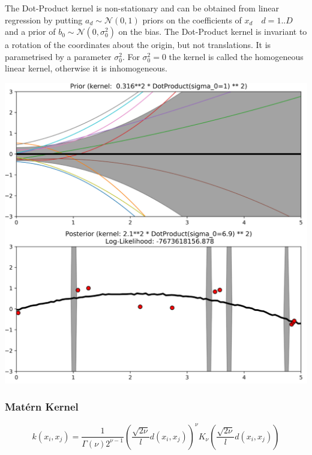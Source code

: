 \documentclass[11pt]{article}
\theoremstyle{definition}
\newcommand*\N[1]{\mathcal{N}\left(#1\right)}
\begin{document}
\noindent
\begin{minipage}{0.55\linewidth}
	The Dot-Product kernel is non-stationary and can be obtained from linear regression by putting $a_d \sim \N{0,1}$ priors on the coefficients of $x_d\quad d=1..D$ and a prior of $b_0 \sim \N{0,\sigma_0^2}$ on the bias. The Dot-Product kernel is invariant to a rotation of the coordinates about the origin, but not translations. It is parametrised by a parameter $\sigma_0^2$. For $\sigma_0^2=0$ the kernel is called the homogeneous linear kernel, otherwise it is inhomogeneous.
\end{minipage}
\hfill
\begin{minipage}{0.42\linewidth}
	\includegraphics[width=\linewidth]{img/dot_product_kernel}
\end{minipage}

\subsubsection{Matérn Kernel}
\begin{equation*}
	k(x_i, x_j) =  \frac{1}{\Gamma(\nu)2^{\nu-1}}\left( \frac{\sqrt{2\nu}}{l} d(x_i , x_j ) \right)^\nu K_\nu\left( \frac{\sqrt{2\nu}}{l} d(x_i , x_j )\right)
\end{equation*}
\end{document}
